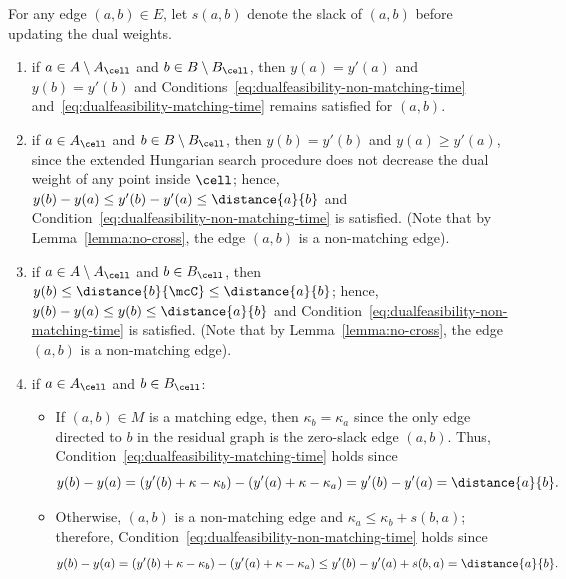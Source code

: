      For any edge $(a,b)\in E$, let $s(a,b)$ denote the slack of $(a,b)$ before updating the dual weights. 
    \begin{enumerate}
        \item if $a\in A\setminus A_\cell$ and $b\in B\setminus B_\cell$, then $y(a)=y'(a)$ and $y(b)=y'(b)$ and Conditions~\eqref{eq:dualfeasibility-non-matching-time} and~\eqref{eq:dualfeasibility-matching-time} remains satisfied for $(a,b)$.
        
        \item if $a\in A_\cell$ and $b\in B\setminus B_\cell$, then $y(b)=y'(b)$ and $y(a)\ge y'(a)$, since the extended Hungarian search procedure does not decrease the dual weight of any point inside $\cell$; hence, $y(b)-y(a)\le y'(b)-y'(a)\le \distance{a}{b}$ and Condition~\eqref{eq:dualfeasibility-non-matching-time} is satisfied. (Note that by Lemma~\ref{lemma:no-cross}, the edge $(a,b)$ is a non-matching edge).

        \item if $a\in A\setminus A_\cell$ and $b\in B_\cell$, then $y(b)\le \distance{b}{\mcC}\le \distance{a}{b}$; hence, $y(b)-y(a)\le y(b)\le \distance{a}{b}$ and Condition~\eqref{eq:dualfeasibility-non-matching-time} is satisfied. (Note that by Lemma~\ref{lemma:no-cross}, the edge $(a,b)$ is a non-matching edge).

        \item if $a\in A_\cell$ and $b\in B_\cell$: 
        \begin{itemize}
            \item If $(a,b)\in M$ is a matching edge, then $\kappa_b = \kappa_a$ since the only edge directed to $b$ in the residual graph is the zero-slack edge $(a,b)$. Thus, Condition~\eqref{eq:dualfeasibility-matching-time} holds since
            \begin{equation*}
            y(b) - y(a) = (y'(b)+\kappa-\kappa_b) - (y'(a)+\kappa-\kappa_a) = y'(b)-y'(a) = \distance{a}{b}.
            \end{equation*}
            \item Otherwise, $(a,b)$ is a non-matching edge and $\kappa_a\le \kappa_b + s(b,a)$; therefore, Condition~\eqref{eq:dualfeasibility-non-matching-time} holds since
            \begin{equation}\label{eq:global-hung-1}
                y(b)-y(a) = (y'(b)+\kappa-\kappa_b) - (y'(a)+\kappa-\kappa_a) \le y'(b)-y'(a) + s(b,a) = \distance{a}{b}.
            \end{equation}
        \end{itemize}
    \end{enumerate}
    
